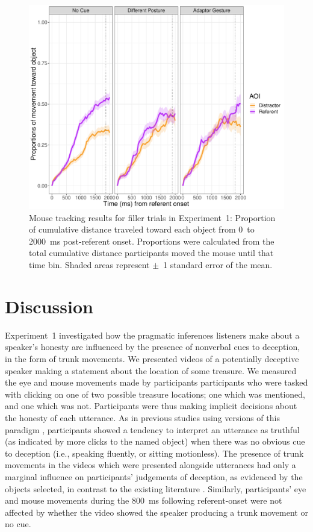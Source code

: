 \documentclass[a4paper,man,natbib]{apa6}
\begin{document}
\begin{figure}[Ht]
  \centering
	\includegraphics[width=\linewidth]{./img/e7_mouse_filler.pdf}
  \caption{Mouse tracking results for filler trials in Experiment~1: Proportion of cumulative distance traveled toward each object from 0~to 2000~ms post-referent onset. Proportions were calculated from the total cumulative distance participants moved the mouse until that time bin. Shaded areas represent $\pm$~1 standard error of the mean.}
  \label{fig:v1_mouse2}
\end{figure}

\section{Discussion}
Experiment~1 investigated how the pragmatic inferences listeners make about a speaker's honesty are influenced by the presence of nonverbal cues to deception, in the form of trunk movements.
We presented videos of a potentially deceptive speaker making a statement about the location of some treasure.
We measured the eye and mouse  movements made by participants participants who were tasked with clicking on one of two possible treasure locations; one which was mentioned, and one which was not.
Participants were thus making implicit decisions about the honesty of each utterance.
As in previous studies using versions of this paradigm \citep{Loy2017, King2018}, participants showed a tendency to interpret an utterance as truthful (as indicated by more clicks to the named object) when there was no obvious cue to deception (i.e., speaking fluently, or sitting motionless).
The presence of trunk movements in the videos which were presented alongside utterances had only a marginal influence on participants' judgements of deception, as evidenced by the objects selected, in contrast to the existing literature \citep[e.g.][]{Vrij1996a, Zuckerman1981}.
Similarly, participants' eye  and mouse  movements during the 800~ms following referent-onset were not affected by whether the video showed the speaker producing a trunk movement or no cue.
\end{document}
